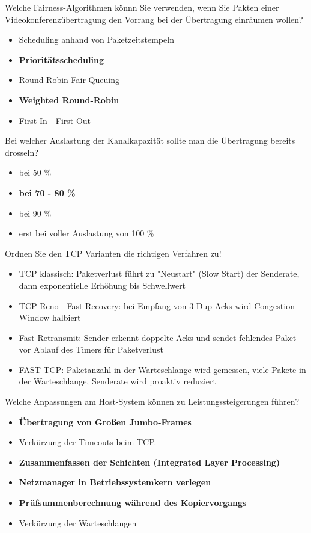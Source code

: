 \documentclass{article}
\begin{document}
	Welche Fairness-Algorithmen könnn Sie verwenden, wenn Sie Pakten einer Videokonferenzübertragung den Vorrang bei der Übertragung einräumen wollen? 
	\begin{itemize}
		\item Scheduling anhand von Paketzeitstempeln
		\item \textbf{Prioritätsscheduling}
		\item Round-Robin Fair-Queuing
		\item \textbf{Weighted Round-Robin}
		\item First In - First Out
	\end{itemize}

	Bei welcher Auslastung der Kanalkapazität sollte man die Übertragung bereits drosseln? 
	\begin{itemize}
		\item bei 50 \% 
		\item \textbf{bei 70 - 80 \% }
		\item bei 90 \%
		\item erst bei voller Auslastung von 100 \%
	\end{itemize}

	Ordnen Sie den TCP Varianten die richtigen Verfahren zu! 
	\begin{itemize}
		\item TCP klassisch: Paketverlust führt zu "Neustart" (Slow Start) der Senderate, dann exponentielle Erhöhung bis Schwellwert 
		\item TCP-Reno - Fast Recovery: bei Empfang von 3 Dup-Acks wird Congestion Window halbiert 
		\item Fast-Retransmit: Sender erkennt doppelte Acks und sendet fehlendes Paket vor Ablauf des Timers für Paketverlust
		\item FAST TCP: Paketanzahl in der Warteschlange wird gemessen, viele Pakete in der Warteschlange, Senderate wird proaktiv reduziert 
	\end{itemize}

	Welche Anpassungen am Host-System können zu Leistungssteigerungen führen?
	\begin{itemize}
		\item \textbf{Übertragung von Großen Jumbo-Frames}
		\item Verkürzung der Timeouts beim TCP.
		\item \textbf{Zusammenfassen der Schichten (Integrated Layer Processing)}
		\item \textbf{Netzmanager in Betriebssystemkern verlegen}
		\item \textbf{Prüfsummenberechnung während des Kopiervorgangs}
		\item Verkürzung der Warteschlangen
	\end{itemize}
	
\end{document}
